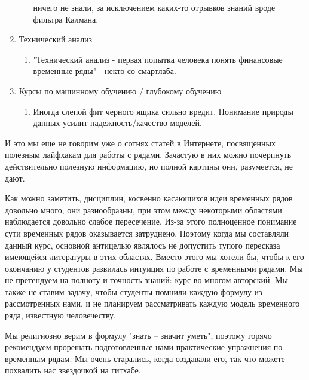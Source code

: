 \begin{enumerate}
\begin{enumerate}
        ничего не знали, за исключением каких-то отрывков знаний
        вроде фильтра Калмана.
    \end{enumerate}
  \item Технический анализ
    \begin{enumerate}
      \item "Технический анализ - первая попытка человека понять финансовые
        временные ряды" - некто со смартлаба.
    \end{enumerate}
  \item Курсы по машинному обучению / глубокому обучению
    \begin{enumerate}
      \item Иногда слепой фит черного ящика сильно вредит. Понимание природы
        данных усилит надежность/качество моделей.
    \end{enumerate}
\end{enumerate}

И это мы еще не говорим уже о сотнях статей в Интернете, посвященных полезным
лайфхакам для работы с рядами. Зачастую в них можно почерпнуть
действительно полезную информацию, но полной картины они, разумеется, не дают.

Как можно заметить, дисциплин, косвенно касающихся идеи временных
рядов довольно много, они разнообразны, при этом между некоторыми областями
наблюдается довольно слабое пересечение.
Из-за этого полноценное понимание сути временных рядов оказывается
затруднено. Поэтому когда мы составляли
данный курс, основной антицелью являлось не допустить тупого
пересказа имеющейся литературы в этих областях. Вместо этого мы
хотели бы, чтобы к  его окончанию у студентов развилась интуиция по
работе с временными рядами. Мы не претендуем на полноту и
точность знаний: курс во многом авторский. Мы также не ставим задачу,
чтобы студенты помнили каждую формулу из
рассмотренных нами, и не планируем рассматривать каждую модель
временного ряда, известную человечеству.

Мы религиозно верим в формулу "знать -- значит уметь", поэтому горячо
рекомендуем прорешать подготовленные нами
\href{https://github.com/IgorEvsin/ts_examples}{практические
упражнения по временным рядам.} Мы очень старались, когда создавали
его, так что можете похвалить нас звездочкой на гитхабе.
